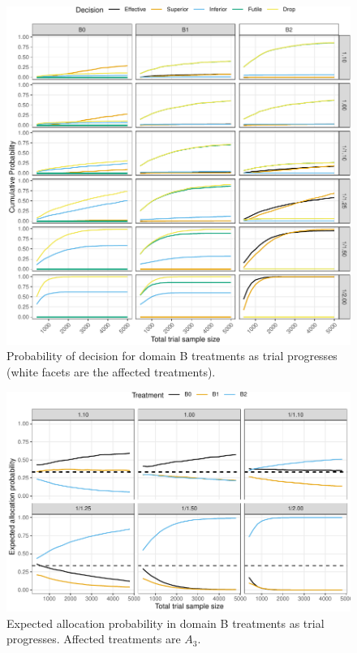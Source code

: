 \documentclass[
]{article}
\begin{document}
\begin{figure}
\centering
\includegraphics{ASCOT_simulations_5_files/figure-latex/unnamed-chunk-9-1.pdf}
\caption{\label{fig:unnamed-chunk-9}Probability of decision for domain B treatments as trial progresses (white facets are the affected treatments).}
\end{figure}

\begin{figure}
\centering
\includegraphics{ASCOT_simulations_5_files/figure-latex/unnamed-chunk-10-1.pdf}
\caption{\label{fig:unnamed-chunk-10}Expected allocation probability in domain B treatments as trial progresses. Affected treatments are \(A_3\).}
\end{figure}
\end{document}
